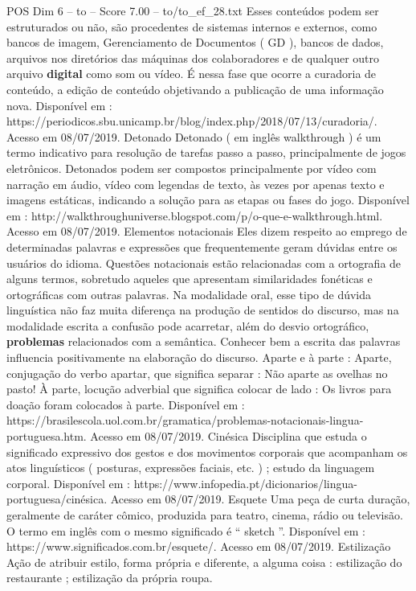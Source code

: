 \begin{textsample}{POS Dim 6 – to – Score 7.00 – to/to\_ef\_28.txt}
Esses conteúdos podem ser estruturados ou não, são procedentes de sistemas internos e externos, como bancos de imagem, Gerenciamento de Documentos ( GD ), bancos de dados, arquivos nos diretórios das máquinas dos colaboradores e de qualquer outro arquivo \textbf{digital} como som ou vídeo.
É nessa fase que ocorre a curadoria de conteúdo, a edição de conteúdo objetivando a publicação de uma informação nova.
Disponível em : https://periodicos.sbu.unicamp.br/blog/index.php/2018/07/13/curadoria/.
Acesso em 08/07/2019.
Detonado Detonado ( em inglês walkthrough ) é um termo indicativo para resolução de tarefas passo a passo, principalmente de jogos eletrônicos.
Detonados podem ser compostos principalmente por vídeo com narração em áudio, vídeo com legendas de texto, às vezes por apenas texto e imagens estáticas, indicando a solução para as etapas ou fases do jogo.
Disponível em : http://walkthroughuniverse.blogspot.com/p/o-que-e-walkthrough.html.
Acesso em 08/07/2019.
Elementos notacionais Eles dizem respeito ao emprego de determinadas palavras e expressões que frequentemente geram dúvidas entre os usuários do idioma.
Questões notacionais estão relacionadas com a ortografia de alguns termos, sobretudo aqueles que apresentam similaridades fonéticas e ortográficas com outras palavras.
Na modalidade oral, esse tipo de dúvida linguística não faz muita diferença na produção de sentidos do discurso, mas na modalidade escrita a confusão pode acarretar, além do desvio ortográfico, \textbf{problemas} relacionados com a semântica.
Conhecer bem a escrita das palavras influencia positivamente na elaboração do discurso.
Aparte e à parte : Aparte, conjugação do verbo apartar, que significa separar : Não aparte as ovelhas no pasto!
À parte, locução adverbial que significa colocar de lado : Os livros para doação foram colocados à parte.
Disponível em : https://brasilescola.uol.com.br/gramatica/problemas-notacionais-lingua-portuguesa.htm.
Acesso em 08/07/2019.
Cinésica Disciplina que estuda o significado expressivo dos gestos e dos movimentos corporais que acompanham os atos linguísticos ( posturas, expressões faciais, etc. ) ; estudo da linguagem corporal.
Disponível em : https://www.infopedia.pt/dicionarios/lingua-portuguesa/cinésica.
Acesso em 08/07/2019.
Esquete Uma peça de curta duração, geralmente de caráter cômico, produzida para teatro, cinema, rádio ou televisão.
O termo em inglês com o mesmo significado é “ sketch ”.
Disponível em : https://www.significados.com.br/esquete/.
Acesso em 08/07/2019.
Estilização Ação de atribuir estilo, forma própria e diferente, a alguma coisa : estilização do restaurante ; estilização da própria roupa.

\end{textsample}
